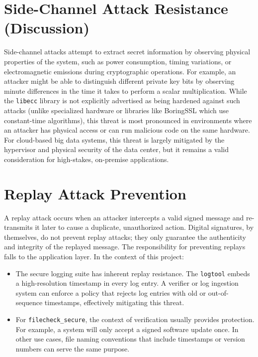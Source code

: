 \section{Side-Channel Attack Resistance (Discussion)}
Side-channel attacks attempt to extract secret information by observing physical properties of the system, such as power consumption, timing variations, or electromagnetic emissions during cryptographic operations. For example, an attacker might be able to distinguish different private key bits by observing minute differences in the time it takes to perform a scalar multiplication. While the \texttt{libecc} library is not explicitly advertised as being hardened against such attacks (unlike specialized hardware or libraries like BoringSSL which use constant-time algorithms), this threat is most pronounced in environments where an attacker has physical access or can run malicious code on the same hardware. For cloud-based big data systems, this threat is largely mitigated by the hypervisor and physical security of the data center, but it remains a valid consideration for high-stakes, on-premise applications.

\section{Replay Attack Prevention}
A replay attack occurs when an attacker intercepts a valid signed message and re-transmits it later to cause a duplicate, unauthorized action. Digital signatures, by themselves, do not prevent replay attacks; they only guarantee the authenticity and integrity of the replayed message. The responsibility for preventing replays falls to the application layer. In the context of this project:
\begin{itemize}
	\item The secure logging suite has inherent replay resistance. The \texttt{logtool} embeds a high-resolution timestamp in every log entry. A verifier or log ingestion system can enforce a policy that rejects log entries with old or out-of-sequence timestamps, effectively mitigating this threat.
	\item For \texttt{filecheck\_secure}, the context of verification usually provides protection. For example, a system will only accept a signed software update once. In other use cases, file naming conventions that include timestamps or version numbers can serve the same purpose.
\end{itemize}